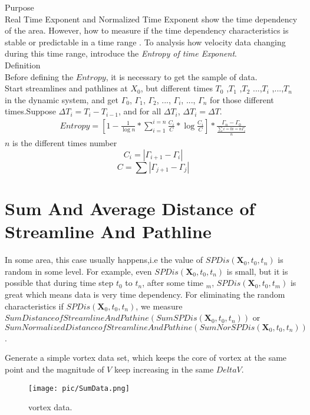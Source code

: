 \documentclass[
     11pt,         %
     a4paper,      %
     oneside,
     ]{article}
\newcommand{\vect}[1]{\boldsymbol{#1}}
\begin{document}
Purpose\\
Real Time Exponent and Normalized Time Exponent show the time dependency of the area. However, how to measure if the time dependency characteristics is stable or predictable in a time range .
To analysis how velocity data changing during this time range, introduce the \textit{Entropy of time Exponent}.\\
Definition\\
Before defining the $Entropy$, it is necessary to get the sample of data. \\
Start streamlines and pathlines at $X_{0}$, but different times $T_{0}$ ,$T_{1}$ ,$T_{2}$ ...,$T_{i}$ ,...,$T_{n}$ in the dynamic system, and get $\Gamma_{0}$, $\Gamma_{1}$, $\Gamma_{2}$, ..., $\Gamma_{i}$, ..., $\Gamma_{n}$ for those different times.Suppose $\Delta T_{i}= T_{i}- T_{i-1}$, and for all $\Delta T_{i}$, $\Delta T_{i}=\Delta T$.
\begin{eqnarray}
Entropy=[1-\frac{1}{\log n}*\sum_{i=1}^{i=n}\frac{C_{i}}{C}*\log \frac{C_{i}}{C}]*\frac{\Gamma_{n}-\Gamma_{0}}{\frac{\sum{i=0}{i=n} \Gamma_{i}}{n}}
\end{eqnarray}
$n$ is the different times number\\
$$C_{i}=\left|\Gamma_{i+1}-\Gamma_{i}\right|$$
$$C=\sum\left|\Gamma_{j+1}-\Gamma_{j}\right|$$



\section{Sum And Average Distance of Streamline And Pathline}

	In some area, this case usually happens,i.e the value of $SPDis(\vect{X}_{0},t_{0},t_{n})$ is random in some level. For example, even $SPDis(\vect{X}_{0},t_{0},t_{n})$ is small, but it is possible that during time step $t_{0}$ to $t_{n}$, after some time  $_{m}$, $SPDis(\vect{X}_{0},t_{0},t_{m})$ is great which means data is very time dependency. For eliminating the random characteristics if $SPDis(\vect{X}_{0},t_{0},t_{n})$, we measure $Sum Distance of Streamline And Pathine (SumSPDis(\vect{X}_{0},t_{0},t_{n}))$ or  $Sum Normalized Distance of Streamline And Pathine (SumNorSPDis(\vect{X}_{0},t_{0},t_{n}))$.

	Generate a simple vortex data set, which keeps the core of vortex at the same point and the magnitude of $V$ keep increasing in the same $Delta V$.\\ 
	\begin{figure}[H]
		\centering
		\texttt{[image: pic/SumData.png]}
		\caption{{\tiny vortex data.}}
		\label{fig:SumVortexData}
	\end{figure}
\end{document}
